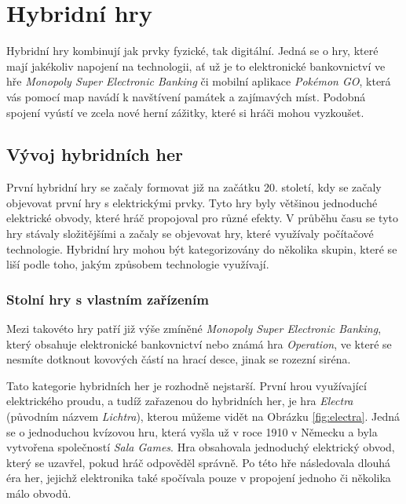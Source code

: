 \chapter{Hybridní hry}
Hybridní hry kombinují jak prvky fyzické, tak digitální. Jedná se o hry, které mají jakékoliv napojení na technologii, ať už je to elektronické bankovnictví ve hře \textit{Monopoly Super Electronic Banking} či mobilní aplikace \textit{Pokémon GO}, která vás pomocí map navádí k navštívení památek a zajímavých míst. Podobná spojení vyústí ve zcela nové herní zážitky, které si hráči mohou vyzkoušet. \cite{hybrid_board_games_design}

\section{Vývoj hybridních her}
První hybridní hry se začaly formovat již na začátku 20. století, kdy se začaly objevovat první hry s elektrickými prvky. Tyto hry byly většinou jednoduché elektrické obvody, které hráč propojoval pro různé efekty. V průběhu času se tyto hry stávaly složitějšími a začaly se objevovat hry, které využívaly počítačové technologie. Hybridní hry mohou být kategorizovány do několika skupin, které se liší podle toho, jakým způsobem technologie využívají. \cite{history_of_hybrid_games}

\subsection{Stolní hry s vlastním zařízením}
Mezi takovéto hry patří již výše zmíněné \textit{Monopoly Super Electronic Banking}, který obsahuje elektronické bankovnictví nebo známá hra \textit{Operation}, ve které se nesmíte dotknout kovových částí na hrací desce, jinak se rozezní siréna. 

Tato kategorie hybridních her je rozhodně nejstarší. První hrou využívající elektrického proudu, a tudíž zařazenou do hybridních her, je hra \textit{Electra} (původním názvem \textit{Lichtra}), kterou můžeme vidět na Obrázku \ref{fig:electra}. Jedná se o jednoduchou kvízovou hru, která vyšla už v roce 1910 v Německu a byla vytvořena společností \textit{Sala Games}. Hra obsahovala jednoduchý elektrický obvod, který se uzavřel, pokud hráč odpověděl správně. Po této hře následovala dlouhá éra her, jejichž elektronika také spočívala pouze v propojení jednoho či několika málo obvodů. \cite{history_of_hybrid_games, boardgames_with_apps}

